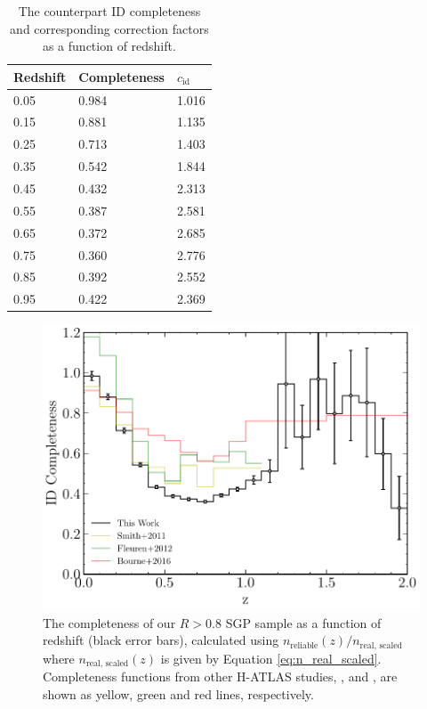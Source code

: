 \begin{table}
    \centering
    \begin{tabular}{p{4.5cm}|p{2.5cm}|p{2.5cm}}
        \hline
        \hline
        Redshift & Completeness & $c_{\textrm{id}}$ \\
        \hline
        \hline
        0.05 & 0.984 & 1.016 \\
        0.15 & 0.881 & 1.135 \\
        0.25 & 0.713 & 1.403 \\
        0.35 & 0.542 & 1.844 \\
        0.45 & 0.432 & 2.313 \\
        0.55 & 0.387 & 2.581 \\
        0.65 & 0.372 & 2.685 \\
        0.75 & 0.360 & 2.776 \\
        0.85 & 0.392 & 2.552 \\
        0.95 & 0.422 & 2.369 \\
        \hline
    \end{tabular}
    \caption[ID completeness as a function of redshift]{The counterpart ID completeness and corresponding correction factors as a function of redshift.}
    \label{tab:id_completeness_table}
\end{table}

\begin{figure}
	\centering
	\includegraphics[width=0.8\columnwidth]{Figures/id_completeness.pdf}
	\caption[Completeness of our reliable SGP sample as a function of redshift]{The completeness of our $R > 0.8$ SGP sample as a function of redshift (black error bars), calculated using $n_{\textrm{reliable}}(z)/n_{\textrm{real, scaled}}$ where $n_{\textrm{real, scaled}}(z)$ is given by Equation \ref{eq:n_real_scaled}. Completeness functions from other H-ATLAS studies, \citealt{Smith_2011}, \citealt{Fleuren_2012} and \citealt{Bourne_2016}, are shown as yellow, green and red lines, respectively.}
	\label{fig:id_completeness}
\end{figure}


